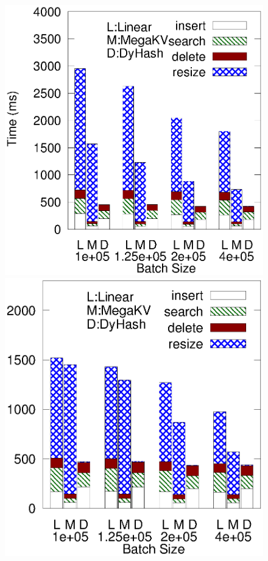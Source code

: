 \begin{figure}[htp]
	\begin{minipage}{0.19\linewidth}\centering
		\includegraphics[width=\linewidth]{pic/dynamic/twitter/diff_batch_size.eps}
		\centerline{\dstwitter}
	\end{minipage}
	\begin{minipage}{0.19\linewidth}\centering
		\includegraphics[width=\linewidth]{pic/dynamic/reddit/diff_batch_size.eps}

\end{minipage}
\end{figure}
